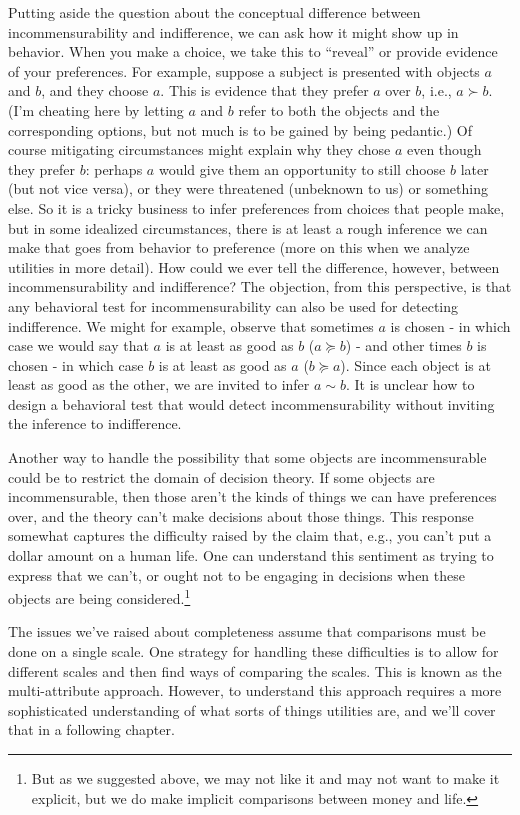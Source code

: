 \documentclass[]{tufte-book}
\begin{document}
Putting aside the question about the conceptual difference between incommensurability and indifference, we can ask how it might show up in behavior. When you make a choice, we take this to ``reveal'' or provide evidence of your preferences. For example, suppose a subject is presented with objects \(a\) and \(b\), and they choose \(a\). This is evidence that they prefer \(a\) over \(b\), i.e., \(a\succ b\). (I'm cheating here by letting \(a\) and \(b\) refer to both the objects and the corresponding options, but not much is to be gained by being pedantic.) Of course mitigating circumstances might explain why they chose \(a\) even though they prefer \(b\): perhaps \(a\) would give them an opportunity to still choose \(b\) later (but not vice versa), or they were threatened (unbeknown to us) or something else. So it is a tricky business to infer preferences from choices that people make, but in some idealized circumstances, there is at least a rough inference we can make that goes from behavior to preference (more on this when we analyze utilities in more detail). How could we ever tell the difference, however, between incommensurability and indifference? The objection, from this perspective, is that any behavioral test for incommensurability can also be used for detecting indifference. We might for example, observe that sometimes \(a\) is chosen - in which case we would say that \(a\) is at least as good as \(b\) (\(a\succeq b\)) - and other times \(b\) is chosen - in which case \(b\) is at least as good as \(a\) (\(b\succeq a\)). Since each object is at least as good as the other, we are invited to infer \(a \sim b\). It is unclear how to design a behavioral test that would detect incommensurability without inviting the inference to indifference.

Another way to handle the possibility that some objects are incommensurable could be to restrict the domain of decision theory. If some objects are incommensurable, then those aren't the kinds of things we can have preferences over, and the theory can't make decisions about those things. This response somewhat captures the difficulty raised by the claim that, e.g., you can't put a dollar amount on a human life. One can understand this sentiment as trying to express that we can't, or ought not to be engaging in decisions when these objects are being considered.\footnote{But as we suggested above, we may not like it and may not want to make it explicit, but we do make implicit comparisons between money and life.}

The issues we've raised about completeness assume that comparisons must be done on a single scale. One strategy for handling these difficulties is to allow for different scales and then find ways of comparing the scales. This is known as the multi-attribute approach. However, to understand this approach requires a more sophisticated understanding of what sorts of things utilities are, and we'll cover that in a following chapter.
\end{document}
